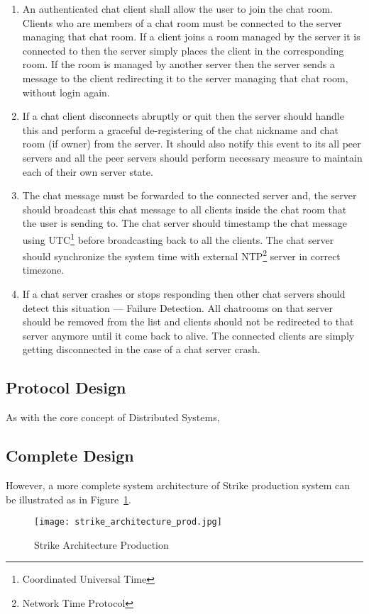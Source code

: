 \documentclass[dareport.tex]{subfiles}
\begin{document}
\begin{enumerate}[leftmargin=*]
\item An authenticated chat client shall allow the user to join the chat room. Clients who are members of a chat room must be connected to the server managing that chat room. If a client joins a room managed by the server it is connected to then the server simply places the client in the corresponding room. If the room is managed by another server then the server sends a message to the client redirecting it to the server managing that chat room, without login again.

\item If a chat client disconnects abruptly or quit then the server should handle this and perform a graceful de-registering of the chat nickname and chat room (if owner) from the server. It should also notify this event to its all peer servers and all the peer servers should perform necessary measure to maintain each of their own server state.

\item The chat message must be forwarded to the connected server and, the server should broadcast this chat message to all clients inside the chat room that the user is sending to. The chat server should timestamp the chat message using UTC\footnote{Coordinated Universal Time} before broadcasting back to all the clients. The chat server should synchronize the system time with external NTP\footnote{Network Time Protocol} server in correct timezone.

\item If a chat server crashes or stops responding then other chat servers should detect this situation --- Failure Detection. All chatrooms on that server should be removed from the list and clients should not be redirected to that server anymore until it come back to alive. The connected clients are simply getting disconnected in the case of a chat server crash.


\end{enumerate}


\subsection{Protocol Design}
As with the core concept of Distributed Systems, 



\subsection{Complete Design}

However, a more complete system architecture of Strike production system can be illustrated as in Figure~\ref{fig:strike_arch_comp}. 

\begin{figure}[h]
\caption{Strike Architecture Production}
\label{fig:strike_arch_comp}
\texttt{[image: strike\_architecture\_prod.jpg]}
\centering
\end{figure}
\end{document}
